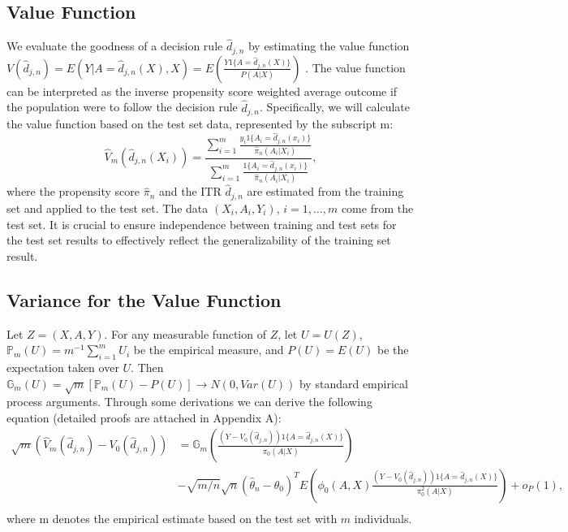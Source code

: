 \documentclass{article}
\begin{document}
\subsection{Value Function}

We evaluate the goodness of a decision rule $\hat{d}_{j,n}$ by estimating the value function $V(\hat{d}_{j,n})  = E(Y|A=\hat{d}_{j,n}(X),X)=E(\frac{Y1\{A=\hat{d}_{j,n}(X)\}}{P(A|X)})$ \cite{qian2011performance}. The value function can be interpreted as the inverse propensity score weighted average outcome if the population were to follow the decision rule $\hat{d}_{j,n}$.
Specifically, we will calculate the value function based on the test set data, represented by the subscript m:
\begin{equation*}
\hat{V}_{m}(\hat{d}_{j,n}(X_i))=\frac{\sum_{i=1}^m \frac{y_i 1\{A_i=\hat{d}_{j,n}(x_i)\}}{\hat{\pi}_n(A_i|X_i)}}{\sum_{i=1}^m\frac{1\{A_i=\hat{d}_{j,n}(x_i)\}}{\hat{\pi}_n(A_i|X_i)}},
\end{equation*}
where the propensity score $\hat{\pi}_n$ and the ITR $\hat{d}_{j,n}$ are estimated from the training set and applied to the test set.  
The data $(X_i,A_i,Y_i)$, $i=1,\dots,m$ come from the test set.  It is crucial to ensure independence between training and test sets for the test set results to effectively reflect the generalizability of the training set result. 

\subsection{Variance for the Value Function}

Let $Z=(X,A,Y)$. For any measurable function of $Z$, let $U = U(Z)$, $\mathbb{P}_{m}(U)=m^{-1}\sum_{i=1}^{m}U_i$ be the empirical measure, and $P(U)=E(U)$ be the expectation taken over $U$. Then
$\mathbb{G}_{m}(U) = \sqrt{m}[\mathbb{P}_{m}(U)-P(U)]\rightarrow N(0,Var(U))$ by standard empirical process arguments. Through some derivations we can derive the following equation (detailed proofs are attached in Appendix A):
\begin{equation}
\label{value_derivation}
    \begin{split}
    \sqrt{m}(\hat{V}_{m}(\hat{d}_{j,n})-V_0(\hat{d}_{j,n})) & = \mathbb{G}_{m}(\frac{(Y- V_0(\hat{d}_{j,n}))1\{A=\hat{d}_{j,n}(X)\}}{\pi_0(A|X)}) \\
    & -\sqrt{m/n}\sqrt{n}(\hat{\theta}_n-\theta_0)^T
    E(\phi_0(A,X)\frac{(Y-V_0(\hat{d}_{j,n}))1\{A=\hat{d}_{j,n}(X)\}}{\pi^2_0(A|X)})+o_P(1),\\
    \end{split}
\end{equation}
where m denotes the empirical estimate based on the test set with $m$ individuals.\\
\end{document}
